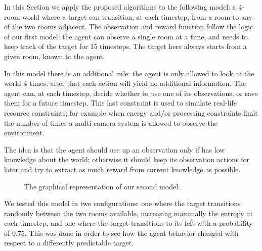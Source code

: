 In this Section we apply the proposed algorithms to the following model: a 4-room world where a
target can transition, at each timestep, from a room to any of the two rooms adjacent. The
observation and reward function follow the logic of our first model: the agent can observe a single
room at a time, and needs to keep track of the target for 15 timesteps. The target here always
starts from a given room, known to the agent.

In this model there is an additional rule: the agent is only allowed to look at the world 4 times;
after that each action will yield no additional information. The agent can, at each timestep, decide
whether to use one of its observations, or save them for a future timestep. This last constraint is
used to simulate real-life resource constraints; for example when energy and/or processing
constraints limit the number of times a multi-camera system is allowed to observe the environment.

The idea is that the agent should use up an observation only if has low knowledge about the world;
otherwise it should keep its observation actions for later and try to extract as much reward from
current knowledge as possible.

\begin{figure}[ht!]
\centering
{}
\caption{The graphical representation of our second model.}
\label{ref:finbudget1}
\end{figure}

We tested this model in two configurations: one where the target transitions randomly between the
two rooms available, increasing maximally the entropy at each timestep, and one where the target
transitions to its left with a probability of $0.75$. This was done in order to see how the agent behavior
changed with respect to a differently predictable target.

